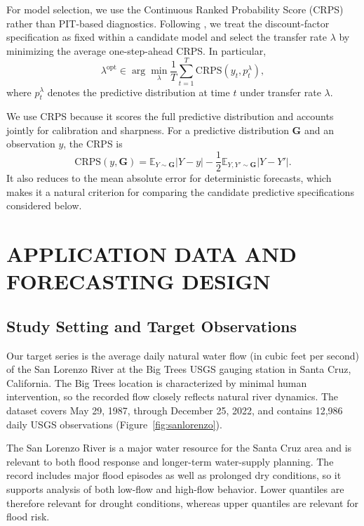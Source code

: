 \documentclass[APA,STIX1COL]{WileyNJD-v2}
\begin{document}
For model selection, we use the Continuous Ranked Probability Score (CRPS) rather than PIT-based diagnostics. Following \citet{barata2021_flex_quantile}, we treat the discount-factor specification as fixed within a candidate model and select the transfer rate \(\lambda\) by minimizing the average one-step-ahead CRPS. In particular,
\[
\lambda^{\text{opt}} \in \arg\min_{\lambda} \frac{1}{T}\sum_{t=1}^T \text{CRPS}(y_t,p_t^{\lambda}),
\]
where \(p_t^{\lambda}\) denotes the predictive distribution at time \(t\) under transfer rate \(\lambda\).

We use CRPS because it scores the full predictive distribution and accounts jointly for calibration and sharpness. For a predictive distribution \(\mathbf{G}\) and an observation \(y\), the CRPS is
\[
\text{CRPS}(y, \mathbf{G}) = \mathbb{E}_{Y \sim \mathbf{G}}|Y - y| - \frac{1}{2}\mathbb{E}_{Y,Y'\sim \mathbf{G}}|Y - Y'|.
\]
It also reduces to the mean absolute error for deterministic forecasts, which makes it a natural criterion for comparing the candidate predictive specifications considered below.

\section{APPLICATION DATA AND FORECASTING DESIGN}
\label{sec:data}

\subsection{Study Setting and Target Observations}

Our target series is the average daily natural water flow (in cubic feet per second) of the San Lorenzo River at the Big Trees USGS gauging station in Santa Cruz, California. The Big Trees location is characterized by minimal human intervention, so the recorded flow closely reflects natural river dynamics. The dataset covers May 29, 1987, through December 25, 2022, and contains 12,986 daily USGS observations (Figure~\ref{fig:sanlorenzo}).

The San Lorenzo River is a major water resource for the Santa Cruz area and is relevant to both flood response and longer-term water-supply planning. The record includes major flood episodes as well as prolonged dry conditions, so it supports analysis of both low-flow and high-flow behavior. Lower quantiles are therefore relevant for drought conditions, whereas upper quantiles are relevant for flood risk.
\end{document}
